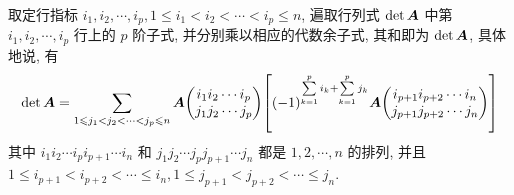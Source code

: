 \begin{theorem}
    取定行指标 $i_1,i_2,\cdots,i_p,1\leqslant i_1<i_2<\cdots<i_p\leqslant n$, 遍取行列式 $\det\vb*{A}$ 中第 $i_1,i_2,\cdots,i_p$ 行上的 $p$ 阶子式, 
    并分别乘以相应的代数余子式, 其和即为 $\det\vb*{A}$, 具体地说, 有
    $$\det\vb*{A} =\sum_{1\leqslant j_1<j_2<\cdots<j_p\leqslant n}\vb*{A}
        \mqty(i_1i_2\cdots i_p\\j_1j_2\cdots j_p)
        \qty[(-1)^{\sum\limits_{k=1}^pi_k+\sum\limits_{k=1}^pj_k}\vb*{A}
            \mqty(i_{p+1}i_{p+2}\cdots i_n\\
            j_{p+1}j_{p+2}\cdots j_n)]$$
    其中 $i_1i_2\cdots i_pi_{p+1}\cdots i_n$ 和 $j_1j_2\cdots j_pj_{p+1}\cdots j_n$ 都是 $1,2,\cdots,n$ 的排列, 
    并且 $1\leqslant i_{p+1}<i_{p+2}<\cdots\leqslant i_n,1\leqslant j_{p+1}<j_{p+2}<\cdots\leqslant j_n$.
\end{theorem}

